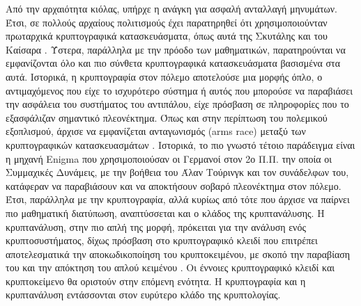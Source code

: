 Από την αρχαιότητα κιόλας, υπήρχε η ανάγκη για ασφαλή ανταλλαγή μηνυμάτων. Έτσι, σε πολλούς αρχαίους πολιτισμούς έχει παρατηρηθεί ότι χρησιμοποιούνταν πρωταρχικά κρυπτογραφικά κατασκευάσματα, όπως αυτά της Σκυτάλης \cite{doi:10.1080/0161-119891886902} και του Καίσαρα \cite{9452465}. Ύστερα, παράλληλα με την πρόοδο των μαθηματικών, παρατηρούνται να εμφανίζονται όλο και πιο σύνθετα κρυπτογραφικά κατασκευάσματα βασισμένα στα αυτά. Ιστορικά, η κρυπτογραφία στον πόλεμο αποτελούσε μια μορφής όπλο, ο αντιμαχόμενος που είχε το ισχυρότερο σύστημα ή αυτός που μπορούσε να παραβιάσει την ασφάλεια του συστήματος του αντιπάλου, είχε πρόσβαση σε πληροφορίες που το εξασφάλιζαν σημαντικό πλεονέκτημα. Όπως και στην περίπτωση του πολεμικού εξοπλισμού, άρχισε να εμφανίζεται ανταγωνισμός (arms race) μεταξύ των κρυπτογραφικών κατασκευασμάτων \cite{osti_1671059}. Ιστορικά, το πιο γνωστό τέτοιο παράδειγμα είναι η μηχανή Enigma που χρησιμοποιούσαν οι Γερμανοί στον 2ο Π.Π. την οποία οι Συμμαχικές Δυνάμεις, με την βοήθεια του Άλαν Τούρινγκ και τον συνάδελφων του, κατάφεραν να παραβιάσουν και να αποκτήσουν σοβαρό πλεονέκτημα στον πόλεμο. Έτσι, παράλληλα με την κρυπτογραφία, αλλά κυρίως από τότε που άρχισε να παίρνει πιο μαθηματική διατύπωση, αναπτύσσεται και ο κλάδος της κρυπτανάλυσης. Η κρυπτανάλυση, στην πιο απλή της μορφή, πρόκειται για την ανάλυση ενός κρυπτοσυστήματος, δίχως πρόσβαση στο κρυπτογραφικό κλειδί που επιτρέπει αποτελεσματικά την αποκωδικοποίηση του κρυπτοκειμένου, με σκοπό την παραβίαση του και την απόκτηση του απλού κειμένου \cite{Bauer2011}. Οι έννοιες κρυπτογραφικό κλειδί και κρυπτοκείμενο θα οριστούν στην επόμενη ενότητα. Η κρυπτογραφία και η κρυπτανάλυση εντάσσονται στον ευρύτερο κλάδο της κρυπτολογίας. 

